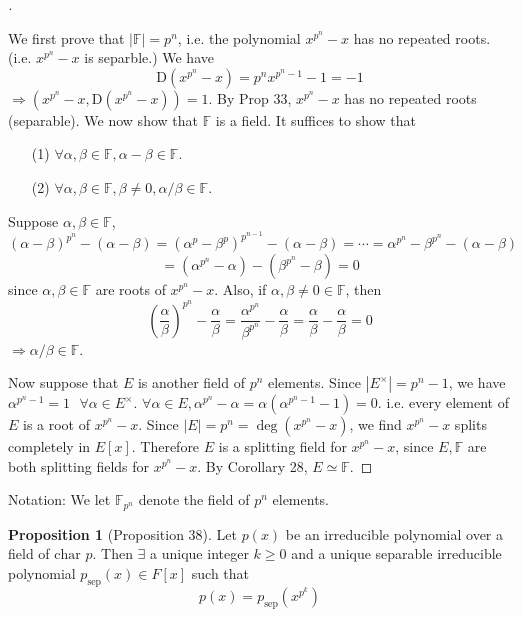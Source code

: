 \documentclass{article}
\newcommand{\sfa}{\text{  } \forall}
\theoremstyle{definition}
\newtheorem{prop}{Proposition}
\newenvironment{proofs}[1][\proofname]{%
  \begin{proof}[#1]$ $\par\nobreak\ignorespaces
}{%
  \end{proof}
}
\begin{document}
\begin{proofs}
	We first prove that $|\mathbb{F}| = p^n$, i.e. the polynomial $x^{p^n} - x$ has no repeated roots.(i.e. $x^{p^n} - x$ is separble.)
	We have
	\[
		\mathrm{D}(x^{p^n} - x) = p^n x^{p^n - 1} - 1 = -1
	\]
	$\Rightarrow (x^{p^n} - x, \mathrm{D} (x^{p^n} - x)) = 1$.
	By Prop 33, $x^{p^n} - x$ has no repeated roots (separable).
	We now show that $\mathbb{F}$ is a field.
	It suffices to show that
	\begin{enumerate}
		\item[(1)] $\forall \alpha, \beta \in \mathbb{F}, \alpha - \beta \in \mathbb{F}$.

		\item[(2)] $\forall \alpha, \beta \in \mathbb{F}, \beta \neq 0, \alpha/\beta \in \mathbb{F}$.
	\end{enumerate}
	Suppose $\alpha, \beta \in \mathbb{F}$, 
	\[
		(\alpha - \beta)^{p^n} - (\alpha - \beta) = (\alpha^p - \beta^p)^{p^{n - 1}} - (\alpha - \beta) = \cdots = \alpha^{p^n} - \beta^{p^n} - (\alpha - \beta)
	\]
	\[
		= (\alpha^{p^n} - \alpha) - (\beta^{p^n} - \beta) = 0
	\]
	since $\alpha, \beta \in \mathbb{F}$ are roots of $x^{p^n} - x$.
	Also, if $\alpha, \beta \neq 0 \in \mathbb{F}$, then
	\[
		\left(\frac{\alpha}{\beta}\right)^{p^n} - \frac{\alpha}{\beta} = \frac{\alpha^{p^n}}{\beta^{p^n}} - \frac{\alpha}{\beta} = \frac{\alpha}{\beta} - \frac{\alpha}{\beta} = 0
	\]
	$\Rightarrow \alpha/\beta \in \mathbb{F}$.
	\par Now suppose that $E$ is another field of $p^n$ elements.
	Since $|E^\times| = p^n - 1$, we have $\alpha^{p^n - 1} = 1 \sfa \alpha \in E^\times$.
	$\forall \alpha \in E, \alpha^{p^n} - \alpha = \alpha(\alpha^{p^n - 1} - 1) = 0$.
	i.e. every element of $E$ is a root of $x^{p^n} - x$.
	Since $|E| = p^n = \deg(x^{p^n} - x)$, we find $x^{p^n} - x$ splits completely in $E[x]$.
	Therefore $E$ is a splitting field for $x^{p^n} - x$, since $E, \mathbb{F}$ are both splitting fields for $x^{p^n} - x$.
	By Corollary 28, $E \simeq \mathbb{F}$.
\end{proofs}

Notation: We let $\mathbb{F}_{p^n}$ denote the field of $p^n$ elements.

\begin{prop}[Proposition 38]
	Let $p(x)$ be an irreducible polynomial over a field of $\text{char } p$.
	Then $\exists$ a unique integer $k \geq 0$ and a unique separable irreducible polynomial $p_{\text{sep}}(x) \in F[x]$ such that 
	\[
		p(x) = p_{\text{sep}}(x^{p^k})
	\]
\end{prop}
\end{document}
